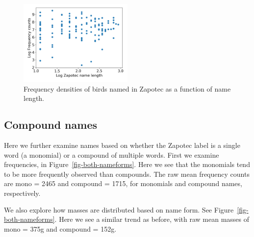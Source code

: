 \documentclass[10pt,letterpaper]{article}
\begin{document}
\begin{figure}[ht!]
  \begin{center}
    \includegraphics[width=0.5\textwidth]{./figures/freq-namelength.png}
        \caption{Frequency densities of birds named in Zapotec as a function of name length.}
        \label{fig-freq-namelength}
  \end{center}
\end{figure}

\subsection{Compound names}
Here we further examine names based on whether the Zapotec label is a single word (a monomial) or a compound of multiple words. First we examine frequencies, in Figure~\ref{fig-both-nameforms}. Here we see that the monomials tend to be more frequently observed than compounds. The raw mean frequency counts are mono = 2465 and compound = 1715, for monomials and compound names, respectively.


We also explore how masses are distributed based on name form. See Figure~\ref{fig-both-nameforms}. Here we see a similar trend as before, with raw mean masses of mono = 375g and compound = 152g.

\end{document}
